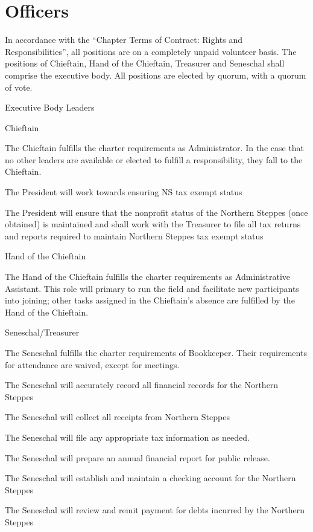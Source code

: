 \documentclass[12pt]{article}
\begin{document}
\section{Officers}
\begin{level}
    \item In accordance with the ``Chapter Terms of Contract: Rights and Responsibilities'', all positions are on a completely unpaid volunteer basis. The positions of Chieftain, Hand of the Chieftain, Treasurer and Seneschal shall comprise the executive body. All positions are elected by quorum, with a quorum of vote.
    \item Executive Body Leaders
    \begin{level}
        \item Chieftain
        \begin{level}
            \item The Chieftain fulfills the charter requirements as Administrator. In the case that no other leaders are available or elected to fulfill a responsibility, they fall to the Chieftain.
            \item The President will work towards ensuring NS tax exempt status
            \item The President will ensure that the nonprofit status of the Northern Steppes (once obtained) is maintained and shall work with the Treasurer to file all tax returns and reports required to maintain Northern Steppes tax exempt status
        \end{level}
        \item Hand of the Chieftain
        \begin{level}
            \item The Hand of the Chieftain fulfills the charter requirements as Administrative Assistant. This role will primary to run the field and facilitate new participants into joining; other tasks assigned in the Chieftain’s absence are fulfilled by the Hand of the Chieftain.
        \end{level}
        \item Seneschal/Treasurer
        \begin{level} 
            \item The Seneschal fulfills the charter requirements of Bookkeeper. Their requirements for attendance are waived, except for meetings.
            \item The Seneschal will accurately record all financial records for the Northern Steppes
            \item The Seneschal will collect all receipts from Northern Steppes
            \item The Seneschal will file any appropriate tax information as needed.
            \item The Seneschal will prepare an annual financial report for public release.
            \item The Seneschal will establish and maintain a checking account for the Northern Steppes
            \item The Seneschal will review and remit payment for debts incurred by the Northern Steppes
        \end{level}
    \end{level}


\end{level}
\end{document}
